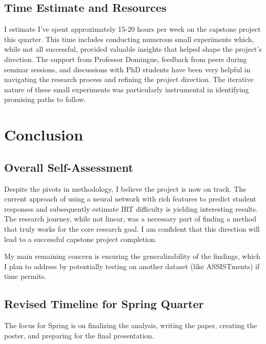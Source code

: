 \documentclass[
    a4paper, %
    10pt, %
    twoside %
]{LTJournalArticle}
\begin{document}
\subsection{Time Estimate and Resources}

I estimate I've spent approximately 15-20 hours per week on the capstone project this quarter. This time includes conducting numerous small experiments which, while not all successful, provided valuable insights that helped shape the project's direction. The support from Professor Domingue, feedback from peers during seminar sessions, and discussions with PhD students have been very helpful in navigating the research process and refining the project direction. The iterative nature of these small experiments was particularly instrumental in identifying promising paths to follow.

\section{Conclusion}

\subsection{Overall Self-Assessment}

Despite the pivots in methodology, I believe the project is now on track. The current approach of using a neural network with rich features to predict student responses and subsequently estimate IRT difficulty is yielding interesting results. The research journey, while not linear, was a necessary part of finding a method that truly works for the core research goal. I am confident that this direction will lead to a successful capstone project completion.

My main remaining concern is ensuring the generalizability of the findings, which I plan to address by potentially testing on another dataset (like ASSISTments) if time permits.

\subsection{Revised Timeline for Spring Quarter}

The focus for Spring is on finalizing the analysis, writing the paper, creating the poster, and preparing for the final presentation.
\end{document}
